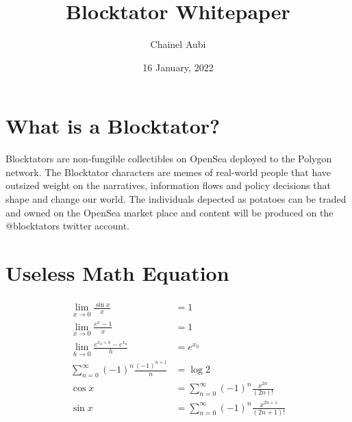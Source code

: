 \documentclass[a4paper,10pt]{article}
\begin{document}
\title{Blocktator Whitepaper}
\author{Chainel Aubi}
\date{16 January, 2022}

\section{What is a Blocktator?}
    \begin{minipage}[b]{1\linewidth}

        Blocktators are non-fungible collectibles on OpenSea deployed to the
        Polygon network. The Blocktator characters are memes of real-world
        people that have outsized weight on the narratives, information flows and
        policy decisions that shape and change our world. The individuals depected
        as potatoes can be traded and owned on the OpenSea market place and content
        will be produced on the @blocktators twitter account.
    \end{minipage}


\section{Useless Math Equation}

    \begin{table}[ht]

        \hspace{0.1cm}
        \begin{minipage}[b]{1\linewidth}\centering
        \begin{align*}
            \lim_{x \to 0} \frac {\sin x}{x}  &= 1 \\
            \lim_{x \to 0} \frac {e^x - 1}{x} &= 1 \\
            \lim_{h \to 0} \frac {e^{{x_0} + h} - e^{x_0}}{h} &= e^{x_0} \\
            \sum_{n = 0}^{\infty} (-1)^n \frac {(-1)^{n + 1}}{n} &= \log 2 \\
            \cos x    &= \sum_{n = 0}^{\infty} (-1)^n \frac {x^{2n}}{(2n)!}  \\
            \sin x    &= \sum_{n = 0}^{\infty} (-1)^n \frac {x^{2n + 1}}{(2n + 1)!}
        \end{align*}
        \end{minipage}

    \end{table}
\end{document}
